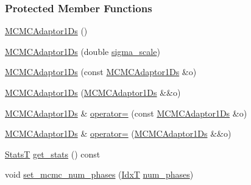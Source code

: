 \subsubsection*{Protected Member Functions}
\begin{DoxyCompactItemize}
\item 
\hyperlink{classmappel_1_1MCMCAdaptor1Ds_abdf4d2924451cd7352a4cfb7a96d6e59}{M\+C\+M\+C\+Adaptor1\+Ds} ()
\item 
\hyperlink{classmappel_1_1MCMCAdaptor1Ds_ac3613aae93c36f7dc524da639617f81e}{M\+C\+M\+C\+Adaptor1\+Ds} (double \hyperlink{classmappel_1_1MCMCAdaptorBase_a76312f7d589bf3f3e754beca174b884b}{sigma\+\_\+scale})
\item 
\hyperlink{classmappel_1_1MCMCAdaptor1Ds_ae5501277c2436ff99e0d21564dec6493}{M\+C\+M\+C\+Adaptor1\+Ds} (const \hyperlink{classmappel_1_1MCMCAdaptor1Ds}{M\+C\+M\+C\+Adaptor1\+Ds} \&o)
\item 
\hyperlink{classmappel_1_1MCMCAdaptor1Ds_ac5521cabc17304b3af2511a715bd5639}{M\+C\+M\+C\+Adaptor1\+Ds} (\hyperlink{classmappel_1_1MCMCAdaptor1Ds}{M\+C\+M\+C\+Adaptor1\+Ds} \&\&o)
\item 
\hyperlink{classmappel_1_1MCMCAdaptor1Ds}{M\+C\+M\+C\+Adaptor1\+Ds} \& \hyperlink{classmappel_1_1MCMCAdaptor1Ds_a1eedeee6319a2ea86ada3ecabb473f00}{operator=} (const \hyperlink{classmappel_1_1MCMCAdaptor1Ds}{M\+C\+M\+C\+Adaptor1\+Ds} \&o)
\item 
\hyperlink{classmappel_1_1MCMCAdaptor1Ds}{M\+C\+M\+C\+Adaptor1\+Ds} \& \hyperlink{classmappel_1_1MCMCAdaptor1Ds_a2bc44e54ccbe1569d31d4f2926cd1fd8}{operator=} (\hyperlink{classmappel_1_1MCMCAdaptor1Ds}{M\+C\+M\+C\+Adaptor1\+Ds} \&\&o)
\item 
\hyperlink{namespacemappel_a04ab395b0cf82c4ce68a36b2212649a5}{StatsT} \hyperlink{classmappel_1_1MCMCAdaptor1Ds_aff41401113d81b876c5bfae158541ba3}{get\+\_\+stats} () const 
\item 
void \hyperlink{classmappel_1_1MCMCAdaptorBase_ad6c75e327e8732abc2654492f372563a}{set\+\_\+mcmc\+\_\+num\+\_\+phases} (\hyperlink{namespacemappel_ab17ec0f30b61ece292439d7ece81d3a8}{IdxT} \hyperlink{classmappel_1_1MCMCAdaptorBase_a44b90a984ace712584074dc17831fe25}{num\+\_\+phases})
\end{DoxyCompactItemize}
